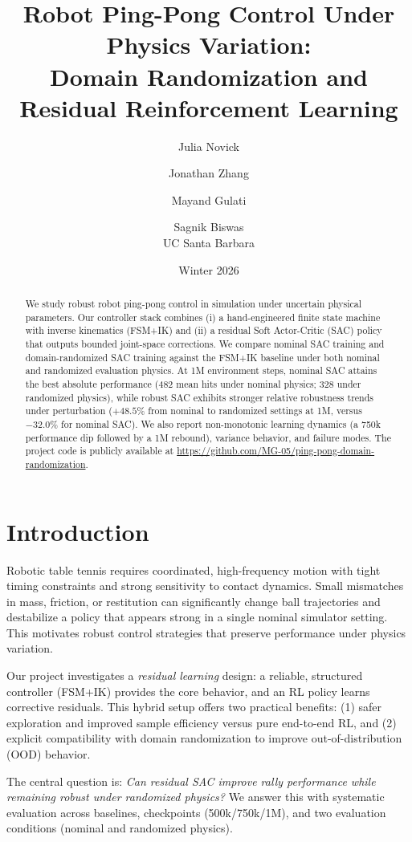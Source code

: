 \documentclass[10pt,twocolumn,letterpaper]{article}
\title{Robot Ping-Pong Control Under Physics Variation:\\
Domain Randomization and Residual Reinforcement Learning}
\author{
Julia Novick \and Jonathan Zhang \and Mayand Gulati \and Sagnik Biswas\\
UC Santa Barbara
}
\date{Winter 2026}
\begin{document}
\maketitle

\begin{abstract}
We study robust robot ping-pong control in simulation under uncertain physical parameters. Our controller stack combines (i) a hand-engineered finite state machine with inverse kinematics (FSM+IK) and (ii) a residual Soft Actor-Critic (SAC) policy that outputs bounded joint-space corrections. We compare nominal SAC training and domain-randomized SAC training against the FSM+IK baseline under both nominal and randomized evaluation physics. At 1M environment steps, nominal SAC attains the best absolute performance (482 mean hits under nominal physics; 328 under randomized physics), while robust SAC exhibits stronger relative robustness trends under perturbation (\(+48.5\%\) from nominal to randomized settings at 1M, versus \(-32.0\%\) for nominal SAC). We also report non-monotonic learning dynamics (a 750k performance dip followed by a 1M rebound), variance behavior, and failure modes. The project code is publicly available at \url{https://github.com/MG-05/ping-pong-domain-randomization}.
\end{abstract}

\section{Introduction}
Robotic table tennis requires coordinated, high-frequency motion with tight timing constraints and strong sensitivity to contact dynamics. Small mismatches in mass, friction, or restitution can significantly change ball trajectories and destabilize a policy that appears strong in a single nominal simulator setting. This motivates robust control strategies that preserve performance under physics variation.

Our project investigates a \emph{residual learning} design: a reliable, structured controller (FSM+IK) provides the core behavior, and an RL policy learns corrective residuals. This hybrid setup offers two practical benefits: (1) safer exploration and improved sample efficiency versus pure end-to-end RL, and (2) explicit compatibility with domain randomization to improve out-of-distribution (OOD) behavior.

The central question is: \emph{Can residual SAC improve rally performance while remaining robust under randomized physics?} We answer this with systematic evaluation across baselines, checkpoints (500k/750k/1M), and two evaluation conditions (nominal and randomized physics).
\end{document}

